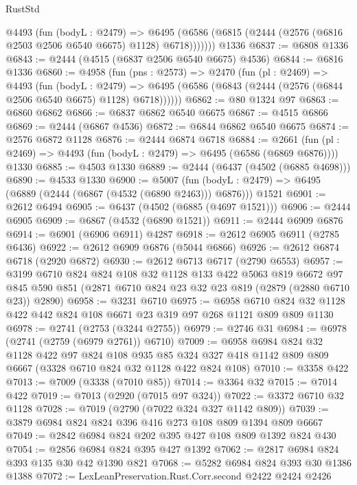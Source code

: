 \begin{lexlean}{RustStd}
\begin{coremodule}
        @4493
          (fun (bodyL : @2479) =>
          @6495 (@6586 (@6815 (@2444 (@2576 (@6816 @2503 @2506 @6540 @6675) @1128) @6718)))))))
    @1336
@6837 := @6808 @1336
@6843 := @2444 (@4515 (@6837 @2506 @6540 @6675) @4536)
@6844 := @6816 @1336
@6860 := @4958
    (fun (pns : @2573) =>
    @2470
      (fun (pl : @2469) =>
      @4493
        (fun (bodyL : @2479) =>
        @6495 (@6586 (@6843 (@2444 (@2576 (@6844 @2506 @6540 @6675) @1128) @6718))))))
@6862 := @80 @1324 @97
@6863 := @6860 @6862
@6866 := @6837 @6862 @6540 @6675
@6867 := @4515 @6866
@6869 := @2444 (@6867 @4536)
@6872 := @6844 @6862 @6540 @6675
@6874 := @2576 @6872 @1128
@6876 := @2444 @6874 @6718
@6884 := @2661
    (fun (pl : @2469) => @4493 (fun (bodyL : @2479) => @6495 (@6586 (@6869 @6876))))
    @1330
@6885 := @4503 @1330
@6889 := @2444 (@6437 (@4502 (@6885 @4698)))
@6890 := @4533 @1330
@6900 := @5007
    (fun (bodyL : @2479) => @6495 (@6889 (@2444 (@6867 (@4532 (@6890 @2463))) @6876)))
    @1521
@6901 := @2612 @6494
@6905 := @6437 (@4502 (@6885 (@4697 @1521)))
@6906 := @2444 @6905
@6909 := @6867 (@4532 (@6890 @1521))
@6911 := @2444 @6909 @6876
@6914 := @6901 (@6906 @6911) @4287
@6918 := @2612 @6905 @6911 (@2785 @6436)
@6922 := @2612 @6909 @6876 (@5044 @6866)
@6926 := @2612 @6874 @6718 (@2920 @6872)
@6930 := @2612 @6713 @6717 (@2790 @6553)
@6957 := @3199
    @6710
    @824
    @824
    @108
    @32
    @1128
    @133
    @422
    @5063
    @819
    @6672
    @97
    @845
    @590
    @851
    (@2871 @6710 @824 @23 @32 @23 @819 (@2879 (@2880 @6710 @23)) @2890)
@6958 := @3231 @6710
@6975 := @6958
    @6710
    @824
    @32
    @1128
    @422
    @442
    @824
    @108
    @6671
    @23
    @319
    @97
    @268
    @1121
    @809
    @809
    @1130
@6978 := @2741 (@2753 (@3244 @2755))
@6979 := @2746 @31
@6984 := @6978 (@2741 (@2759 (@6979 @2761)) @6710)
@7009 := @6958
    @6984
    @824
    @32
    @1128
    @422
    @97
    @824
    @108
    @935
    @85
    @324
    @327
    @418
    @1142
    @809
    @809
    @6667
    (@3328 @6710 @824 @32 @1128 @422 @824 @108)
@7010 := @3358 @422
@7013 := @7009 (@3338 (@7010 @85))
@7014 := @3364 @32
@7015 := @7014 @422
@7019 := @7013 (@2920 (@7015 @97 @324))
@7022 := @3372 @6710 @32 @1128
@7028 := @7019 (@2790 (@7022 @324 @327 @1142 @809))
@7039 := @3879 @6984 @824 @824 @396 @416 @273 @108 @809 @1394 @809 @6667
@7049 := @2842 @6984 @824 @202 @395 @427 @108 @809 @1392 @824 @430
@7054 := @2856 @6984 @824 @395 @427 @1392
@7062 := @2817 @6984 @824 @393 @135 @30 @42 @1390 @821
@7068 := @5282 @6984 @824 @393 @30 @1386 @1388
@7072 := LexLeanPreservation.Rust.Corr.second @2422 @2424 @2426

\end{coremodule}
\end{lexlean}

